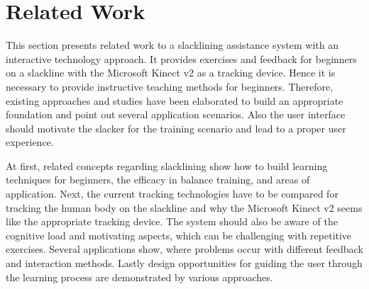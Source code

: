 \chapter{Related Work}\label{2_relatedWork}

This section presents related work to a slacklining assistance system with an interactive technology approach.
It provides exercises and feedback for beginners on a slackline with the Microsoft Kinect v2 as a tracking device.
Hence it is necessary to provide instructive teaching methods for beginners.
Therefore, existing approaches and studies have been elaborated to build an appropriate foundation and point out several application scenarios.
Also the user interface should motivate the slacker for the training scenario and lead to a proper user experience.

At first, related concepts regarding slacklining show how to build learning techniques for beginners, the efficacy in balance training, and areas of application.
Next, the current tracking technologies have to be compared for tracking the human body on the slackline and why the Microsoft Kinect v2 seems like the appropriate tracking device.
The system should also be aware of the cognitive load and motivating aspects, which can be challenging with repetitive exercises.
Several applications show, where problems occur with different feedback and interaction methods.
Lastly design opportunities for guiding the user through the learning process are demonstrated by various approaches.

\label{2_1_slacklineTraining}

\label{2_2_interactiveTechnology}

\label{2_3_feedbackMethods}

\label{2_4_uiDesign}


\newpage
